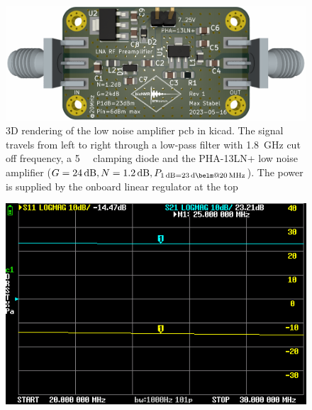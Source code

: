 \begin{figure}[hbt]
    \centering
    \includegraphics[width=\textwidth]{images/preamp.png}
    \caption{ 3D rendering of the low noise amplifier \acrshort{pcb} in \gls{kicad}. The signal travels from left to right through a low-pass filter with \qty{1.8}{\giga\hertz} cut off frequency, a \qty{+5}{\deci\belm} clamping diode and the PHA-13LN+ low noise amplifier (\(G = \qty{24}{\deci\bel}, N = \qty{1.2}{\deci\bel}, P_{\qty{1}{\deci\bel} = \qty{23}{\deci\belm} @\qty{20}{\mega\hertz}}\)). The power is supplied by the onboard linear regulator at the top}
\end{figure}

\begin{figure}[hbt]
    \centering
    \includegraphics[width=\textwidth]{images/preamp_20DB_25MHz.png}
    \caption{ }
\end{figure}

